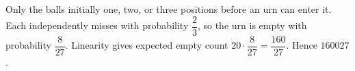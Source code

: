 Only the balls initially one, two, or three positions before an urn can enter it. Each independently misses with probability $\dfrac{2}{3}$, so the urn is empty with probability $\dfrac{8}{27}$. Linearity gives expected empty count $20\cdot\dfrac{8}{27}=\dfrac{160}{27}$. Hence $\boxed{160027}$.
